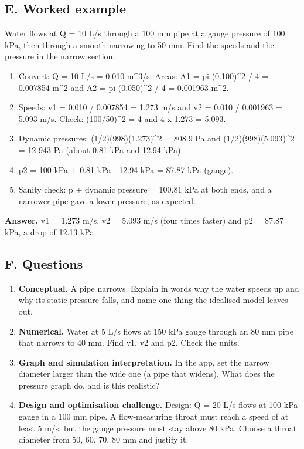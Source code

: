 \documentclass[11pt,a4paper]{article}
\begin{document}
\subsection*{E. Worked example}
Water flows at Q = 10 L/s through a 100 mm pipe at a gauge pressure of 100 kPa, then through a smooth narrowing to 50 mm. Find the speeds and the pressure in the narrow section.
\begin{enumerate}[nosep]
\item Convert: Q = 10 L/s = 0.010 m\textasciicircum{}3/s. Areas: A1 = pi (0.100)\textasciicircum{}2 / 4 = 0.007854 m\textasciicircum{}2 and A2 = pi (0.050)\textasciicircum{}2 / 4 = 0.001963 m\textasciicircum{}2.
\item Speeds: v1 = 0.010 / 0.007854 = 1.273 m/s and v2 = 0.010 / 0.001963 = 5.093 m/s. Check: (100/50)\textasciicircum{}2 = 4 and 4 x 1.273 = 5.093.
\item Dynamic pressures: (1/2)(998)(1.273)\textasciicircum{}2 = 808.9 Pa and (1/2)(998)(5.093)\textasciicircum{}2 = 12 943 Pa (about 0.81 kPa and 12.94 kPa).
\item p2 = 100 kPa + 0.81 kPa - 12.94 kPa = 87.87 kPa (gauge).
\item Sanity check: p + dynamic pressure = 100.81 kPa at both ends, and a narrower pipe gave a lower pressure, as expected.
\end{enumerate}
\textbf{Answer.} v1 = 1.273 m/s, v2 = 5.093 m/s (four times faster) and p2 = 87.87 kPa, a drop of 12.13 kPa.

\subsection*{F. Questions}
\begin{enumerate}[nosep]
\item \textbf{Conceptual.} A pipe narrows. Explain in words why the water speeds up and why its static pressure falls, and name one thing the idealised model leaves out.
\item \textbf{Numerical.} Water at 5 L/s flows at 150 kPa gauge through an 80 mm pipe that narrows to 40 mm. Find v1, v2 and p2. Check the units.
\item \textbf{Graph and simulation interpretation.} In the app, set the narrow diameter larger than the wide one (a pipe that widens). What does the pressure graph do, and is this realistic?
\item \textbf{Design and optimisation challenge.} Design: Q = 20 L/s flows at 100 kPa gauge in a 100 mm pipe. A flow-measuring throat must reach a speed of at least 5 m/s, but the gauge pressure must stay above 80 kPa. Choose a throat diameter from 50, 60, 70, 80 mm and justify it.
\end{enumerate}
\end{document}
